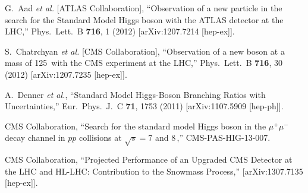\documentclass[10pt]{article}
\begin{document}
\begin{thebibliography}{99}


  G.~Aad {\it et al.}  [ATLAS Collaboration],
  ``Observation of a new particle in the search for the Standard Model Higgs boson with the ATLAS detector at the LHC,''
  Phys.\ Lett.\ B {\bf 716}, 1 (2012)
  [arXiv:1207.7214 [hep-ex]].
  
  S.~Chatrchyan {\it et al.}  [CMS Collaboration],
  ``Observation of a new boson at a mass of 125\,\GeV{} with the CMS experiment at the LHC,''
  Phys.\ Lett.\ B {\bf 716}, 30 (2012)
  [arXiv:1207.7235 [hep-ex]].


  A.~Denner {\it et al.},
  ``Standard Model Higgs-Boson Branching Ratios with Uncertainties,''
  Eur.\ Phys.\ J.\ C {\bf 71}, 1753 (2011)
  [arXiv:1107.5909 [hep-ph]].


  CMS Collaboration,
  ``Search for the standard model Higgs boson in the $\mu^+\mu^-$ decay channel 
in $pp$ collisions at $\sqrt{s}= 7$ and 8\,\TeV{},''
  CMS-PAS-HIG-13-007.


  CMS Collaboration,
  ``Projected Performance of an Upgraded CMS Detector at the LHC and HL-LHC: Contribution to the Snowmass Process,''
  [arXiv:1307.7135 [hep-ex]].

\end{thebibliography}

 
\end{document}

